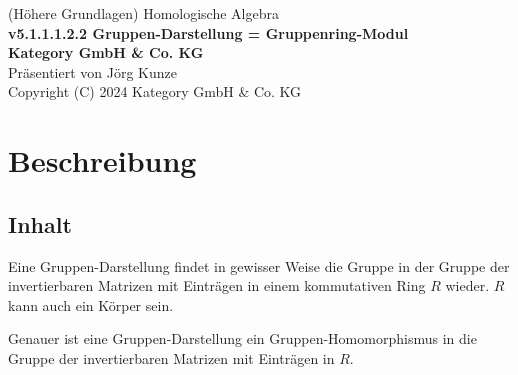 \documentclass[a4paper]{amsart}
\theoremstyle{definition}
\begin{document}
\begin{titlepage}
\centering
{\huge
(Höhere Grundlagen) Homologische Algebra\\[1cm]
\textbf{v5.1.1.1.2.2 Gruppen-Darstellung = Gruppenring-Modul}
}\\[1cm]

\textbf{Kategory GmbH \& Co. KG}\\
Präsentiert von Jörg Kunze\\
Copyright (C) 2024 Kategory GmbH \& Co. KG

\end{titlepage}

%

\newpage

\section*{Beschreibung}

\subsection*{Inhalt}
Eine Gruppen-Darstellung findet in gewisser Weise die Gruppe in der Gruppe der invertierbaren Matrizen mit Einträgen in einem kommutativen Ring $R$ wieder. $R$ kann auch ein Körper sein.

Genauer ist eine Gruppen-Darstellung ein Gruppen-Homomorphismus in die Gruppe der invertierbaren Matrizen mit Einträgen in $R$.
\end{document}
